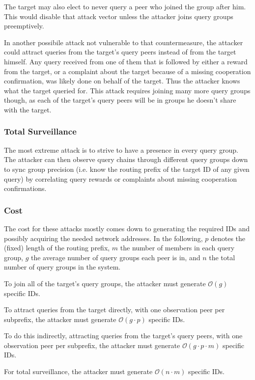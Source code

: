 The target may also elect to never query a peer who joined the group after him.
This would disable that attack vector unless the attacker joins query groups
preemptively.

In another possibile attack not vulnerable to that countermeasure, the attacker
could attract queries from the target's query peers instead of from the target
himself. Any query received from one of them that is followed by either a reward
from the target, or a complaint about the target because of a missing
cooperation confirmation, was likely done on behalf of the target. Thus the
attacker knows what the target queried for. This attack requires joining many
more query groups though, as each of the target's query peers will be in groups
he doesn't share with the target.

\subsubsection{Total Surveillance}
The most extreme attack is to strive to have a presence in every query group.
The attacker can then observe query chains through different query groups down
to sync group precision (i.e. know the routing prefix of the target ID of any
given query) by correlating query rewards or complaints about missing
cooperation confirmations.

\subsubsection{Cost}
The cost for these attacks mostly comes down to generating the required IDs and
possibly acquiring the needed network addresses. In the following, $p$ denotes
the (fixed) length of the routing prefix, $m$ the number of members in each
query group, $g$ the average number of query groups each peer is in, and $n$ the
total number of query groups in the system.

To join all of the target's query groups, the attacker must generate
$\mathcal{O}(g)$ specific IDs.

To attract queries from the target directly, with one observation peer per
subprefix, the attacker must generate $\mathcal{O}(g \cdot p)$ specific IDs.

To do this indirectly, attracting queries from the target's query peers, with
one observation peer per subprefix, the attacker must generate $\mathcal{O}(g
\cdot p \cdot m)$ specific IDs.

For total surveillance, the attacker must generate $\mathcal{O}(n \cdot m)$
specific IDs.

